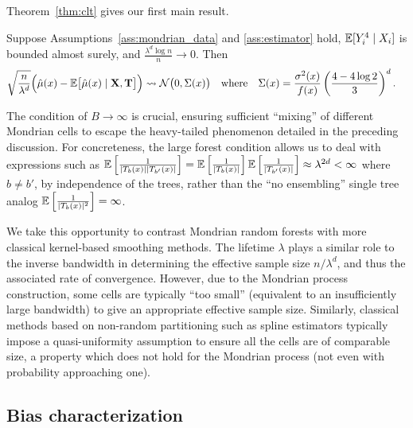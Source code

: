 Theorem~\ref{thm:clt} gives our first main result.

\begin{theorem}%
  \label{thm:clt}
  Suppose Assumptions~\ref{ass:mondrian_data} and \ref{ass:estimator} hold,
  $\mathbb{E}[Y_i^4 \mid X_i ]$ is bounded almost surely,
  and $\frac{\lambda^d \log n}{n} \to 0$. Then
  \begin{align*}
    \sqrt{\frac{n}{\lambda^d}}
    \Big( \hat \mu(x) - \mathbb{E} \big[ \hat \mu(x) \mid \mathbf{X}, \mathbf{T} \big] \Big)
    &\rightsquigarrow \mathcal{N}\big(0, \Sigma(x)\big)
    & &\text{where}
    &\Sigma(x) &=
    \frac{\sigma^2(x)}{f(x)} \left( \frac{4 - 4 \log 2}{3 } \right)^d.
  \end{align*}
\end{theorem}

The condition of $B \to \infty$ is crucial, ensuring sufficient ``mixing'' of
different Mondrian cells to escape the heavy-tailed phenomenon detailed in the
preceding discussion. For concreteness, the large forest condition allows us to
deal with expressions such as
$\mathbb{E} \left[ \frac{1}{|T_b(x)| |T_{b'}(x)|} \right]
= \mathbb{E} \left[ \frac{1}{|T_b(x)|} \right] \mathbb{E} \left[ \frac{1}{|T_{b'}(x)|} \right]
\approx \lambda^{2d} < \infty$
where $b \neq b'$, by independence of the trees, rather than the ``no
ensembling'' single tree analog
$\mathbb{E} \left[ \frac{1}{|T_b(x)|^2} \right] = \infty$.

We take this opportunity to contrast Mondrian random forests with more
classical kernel-based smoothing methods. The lifetime $\lambda$ plays a
similar role to the inverse bandwidth in determining the effective sample size
$n / \lambda^d$, and thus the associated rate of convergence. However, due to
the Mondrian process construction, some cells are typically ``too small''
(equivalent to an insufficiently large bandwidth) to give an appropriate
effective sample size. Similarly, classical methods based on non-random
partitioning such as spline estimators \citep{huang2003local,cattaneo2020large}
typically impose a quasi-uniformity assumption to ensure all the cells are of
comparable size, a property which does not hold for the Mondrian process (not
even with probability approaching one).

\subsection*{Bias characterization}

